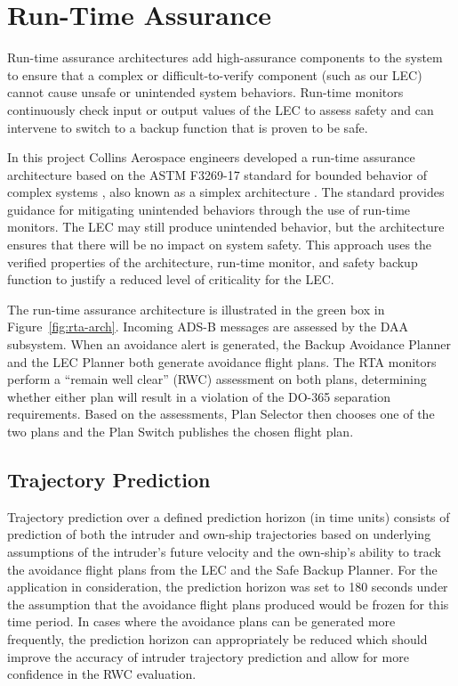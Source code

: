 \section{Run-Time Assurance}
\label{sec:rta}

Run-time assurance architectures add high-assurance components
to the system to ensure that a complex or difficult-to-verify component (such as our LEC) cannot cause
unsafe or unintended system behaviors. Run-time monitors
continuously check input or output values of the LEC to assess safety and can intervene to
switch to a backup function that is proven to be safe. 

In this project Collins Aerospace engineers developed a
run-time assurance architecture based on the ASTM F3269-17
standard for bounded behavior of complex systems \cite{F3269-17}, also
known as a simplex architecture \cite{simplex}. The standard provides
guidance for mitigating unintended behaviors through the
use of run-time monitors. The LEC may still produce unintended
behavior, but the architecture ensures that there will
be no impact on system safety. This approach  uses
the verified properties of the architecture, run-time monitor,
and safety backup function to justify a reduced level of
criticality for the LEC.

The run-time assurance architecture is illustrated in the green box in Figure~\ref{fig:rta-arch}.  Incoming ADS-B messages are assessed by the DAA subsystem.  When an avoidance alert is generated, the Backup Avoidance Planner and the LEC Planner both generate avoidance flight plans.  The RTA monitors perform a ``remain well clear'' (RWC) assessment on both plans, determining whether either plan will result in a violation of the DO-365 separation requirements.  Based on the assessments, Plan Selector then chooses one of the two plans and the Plan Switch publishes the chosen flight plan.

\subsection{Trajectory Prediction} 
Trajectory prediction over a defined prediction horizon (in time units) consists of prediction of both the intruder and own-ship trajectories based on underlying assumptions of the intruder's future velocity and the own-ship's ability to track the avoidance flight plans from the LEC and the Safe Backup Planner. For the application in consideration, the prediction horizon was set to 180 seconds under the assumption that the avoidance flight plans produced would be frozen for this time period. In cases where the avoidance plans can be generated more frequently, the prediction horizon can appropriately be reduced which should improve the accuracy of intruder trajectory prediction and allow for more confidence in the RWC evaluation.

